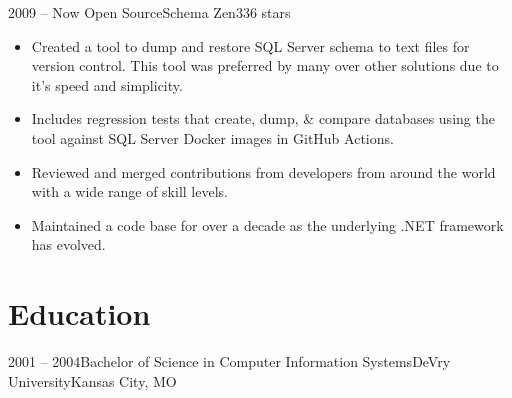 \documentclass[11pt,letterpaper,final]{moderncv}
\begin{document}
	\cventry
{2009 -- Now } {Open Source}{Schema Zen}{}{336 stars}{
		\begin{itemize}
			\item 
				Created a tool to dump and restore SQL Server schema to text
				files for version control. This tool was preferred by many over
				other solutions due to it's speed and simplicity.
			\item 
				Includes regression tests that create, dump, \& compare
				databases using the tool against SQL Server Docker images in
				GitHub Actions.
			\item 
				Reviewed and merged contributions from developers from around the world
				with a wide range of skill levels.
			\item 
				Maintained a code base for over a decade as the underlying .NET
				framework has evolved.
		\end{itemize}
}
\linebreak


\section{Education} 
	\cventry
{2001 -- 2004}{Bachelor of Science in Computer Information Systems}{DeVry University}{Kansas City, MO}{}{}
\end{document}
